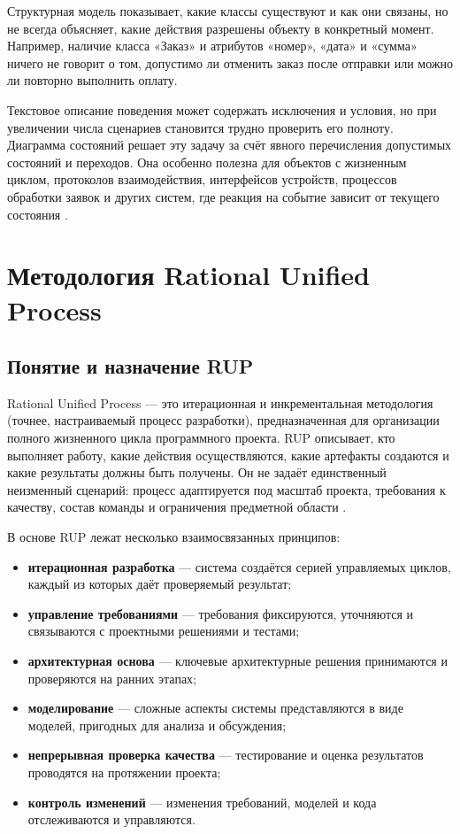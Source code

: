 \documentclass[essay,paper]{pmk-graduate}
\begin{document}
Структурная модель показывает, какие классы существуют и как они связаны, но не всегда объясняет, какие действия разрешены объекту в конкретный момент. Например, наличие класса «Заказ» и атрибутов «номер», «дата» и «сумма» ничего не говорит о том, допустимо ли отменить заказ после отправки или можно ли повторно выполнить оплату.

Текстовое описание поведения может содержать исключения и условия, но при увеличении числа сценариев становится трудно проверить его полноту. Диаграмма состояний решает эту задачу за счёт явного перечисления допустимых состояний и переходов. Она особенно полезна для объектов с жизненным циклом, протоколов взаимодействия, интерфейсов устройств, процессов обработки заявок и других систем, где реакция на событие зависит от текущего состояния \cite{harel1987,fowler2003}.

\section{Методология Rational Unified Process}

\subsection{Понятие и назначение RUP}

Rational Unified Process — это итерационная и инкрементальная методология (точнее, настраиваемый процесс разработки), предназначенная для организации полного жизненного цикла программного проекта. RUP описывает, кто выполняет работу, какие действия осуществляются, какие артефакты создаются и какие результаты должны быть получены. Он не задаёт единственный неизменный сценарий: процесс адаптируется под масштаб проекта, требования к качеству, состав команды и ограничения предметной области \cite{kruchten2003,jacobson1999}.

В основе RUP лежат несколько взаимосвязанных принципов:
\begin{itemize}
  \item \textbf{итерационная разработка} — система создаётся серией управляемых циклов, каждый из которых даёт проверяемый результат;
  \item \textbf{управление требованиями} — требования фиксируются, уточняются и связываются с проектными решениями и тестами;
  \item \textbf{архитектурная основа} — ключевые архитектурные решения принимаются и проверяются на ранних этапах;
  \item \textbf{моделирование} — сложные аспекты системы представляются в виде моделей, пригодных для анализа и обсуждения;
  \item \textbf{непрерывная проверка качества} — тестирование и оценка результатов проводятся на протяжении проекта;
  \item \textbf{контроль изменений} — изменения требований, моделей и кода отслеживаются и управляются.
\end{itemize}
\end{document}
